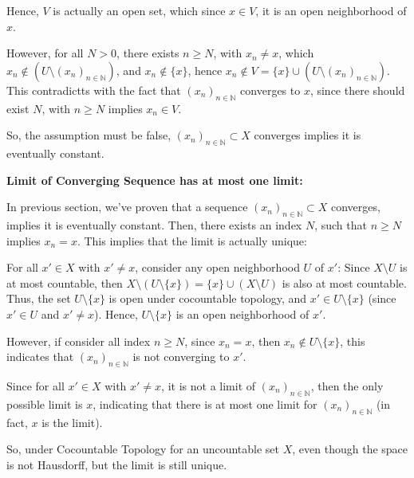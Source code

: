 \documentclass{article}
\begin{document}
Hence, $V$ is actually an open set, which since $x\in V$, it is an open neighborhood of $x$.

However, for all $N>0$, there exists $n\geq N$, with $x_n\neq x$, which $x_n\notin (U\setminus (x_n)_{n\in\mathbb{N}})$, and $x_n\notin \{x\}$,
hence $x_n \notin V=\{x\}\cup (U\setminus (x_n)_{n\in\mathbb{N}})$. This contradictts with the fact that $(x_n)_{n\in\mathbb{N}}$ converges to $x$,
since there should exist $N$, with $n\geq N$ implies $x_n \in V$.

So, the assumption must be false, $(x_n)_{n\in\mathbb{N}}\subset X$ converges implies it is eventually constant.

\hfill

\hfill

\textbf{Limit of Converging Sequence has at most one limit:}

In previous section, we've proven that a sequence $(x_n)_{n\in\mathbb{N}}\subset X$ converges, implies it is eventually constant.
Then, there exists an index $N$, such that $n\geq N$ implies $x_n=x$. This implies that the limit is actually unique:

For all $x'\in X$ with $x'\neq x$, consider any open neighborhood $U$ of $x'$: Since $X\setminus U$ is at most countable, then $X\setminus(U\setminus\{x\})=\{x\}\cup (X\setminus U)$ is also at most countable.
Thus, the set $U\setminus \{x\}$ is open under cocountable topology, and $x'\in U\setminus\{x\}$ (since $x'\in U$ and $x'\neq x$).
Hence, $U\setminus\{x\}$ is an open neighborhood of $x'$.

However, if consider all index $n\geq N$, since $x_n=x$, then $x_n \notin U\setminus\{x\}$, this indicates that $(x_n)_{n\in\mathbb{N}}$ is not converging to $x'$.

Since for all $x'\in X$ with $x'\neq x$, it is not a limit of $(x_n)_{n\in\mathbb{N}}$, then the only possible limit is $x$,
indicating that there is at most one limit for $(x_n)_{n\in\mathbb{N}}$ (in fact, $x$ is the limit).


So, under Cocountable Topology for an uncountable set $X$, even though the space is not Hausdorff, but the limit is still unique.
\end{document}
